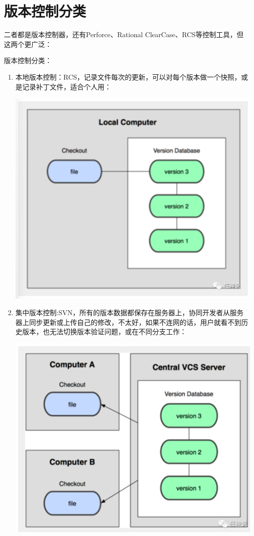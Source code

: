 \documentclass{article}
\begin{document}
\section{版本控制分类}

二者都是版本控制器，还有Perforce、Rational ClearCase、RCS等控制工具，但这两个更广泛：

版本控制分类：
\begin{enumerate}
    \item 本地版本控制：RCS，记录文件每次的更新，可以对每个版本做一个快照，或是记录补丁文件，适合个人用：
    
\centering
\includegraphics{image/2.1.png}

    \item 集中版本控制:SVN，所有的版本数据都保存在服务器上，协同开发者从服务器上同步更新或上传自己的修改，不太好，如果不连网的话，用户就看不到历史版本，也无法切换版本验证问题，或在不同分支工作：

\centering
\includegraphics{image/2.2.png}


\end{enumerate}
\end{document}

